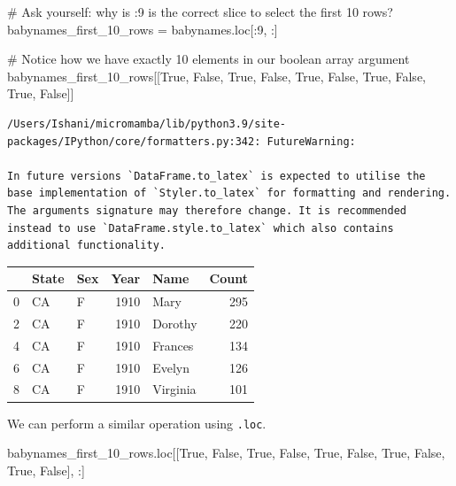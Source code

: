 \documentclass[
  letterpaper,
  DIV=11,
  numbers=noendperiod]{scrreprt}
\newenvironment{Shaded}{\begin{snugshade}}{\end{snugshade}}
\newcommand{\CommentTok}[1]{\textcolor[rgb]{0.37,0.37,0.37}{#1}}
\newcommand{\DecValTok}[1]{\textcolor[rgb]{0.68,0.00,0.00}{#1}}
\newcommand{\NormalTok}[1]{\textcolor[rgb]{0.00,0.23,0.31}{#1}}
\newcommand{\OperatorTok}[1]{\textcolor[rgb]{0.37,0.37,0.37}{#1}}
\newcommand{\VariableTok}[1]{\textcolor[rgb]{0.07,0.07,0.07}{#1}}
\begin{document}
\begin{Shaded}
\begin{Highlighting}[]
\CommentTok{\# Ask yourself: why is :9 is the correct slice to select the first 10 rows?}
\NormalTok{babynames\_first\_10\_rows }\OperatorTok{=}\NormalTok{ babynames.loc[:}\DecValTok{9}\NormalTok{, :]}

\CommentTok{\# Notice how we have exactly 10 elements in our boolean array argument}
\NormalTok{babynames\_first\_10\_rows[[}\VariableTok{True}\NormalTok{, }\VariableTok{False}\NormalTok{, }\VariableTok{True}\NormalTok{, }\VariableTok{False}\NormalTok{, }\VariableTok{True}\NormalTok{, }\VariableTok{False}\NormalTok{, }\VariableTok{True}\NormalTok{, }\VariableTok{False}\NormalTok{, }\VariableTok{True}\NormalTok{, }\VariableTok{False}\NormalTok{]]}
\end{Highlighting}
\end{Shaded}

\begin{verbatim}
/Users/Ishani/micromamba/lib/python3.9/site-packages/IPython/core/formatters.py:342: FutureWarning:

In future versions `DataFrame.to_latex` is expected to utilise the base implementation of `Styler.to_latex` for formatting and rendering. The arguments signature may therefore change. It is recommended instead to use `DataFrame.style.to_latex` which also contains additional functionality.
\end{verbatim}

\begin{tabular}{lllrlr}
\toprule
{} & State & Sex &  Year &      Name &  Count \\
\midrule
0 &    CA &   F &  1910 &      Mary &    295 \\
2 &    CA &   F &  1910 &   Dorothy &    220 \\
4 &    CA &   F &  1910 &   Frances &    134 \\
6 &    CA &   F &  1910 &    Evelyn &    126 \\
8 &    CA &   F &  1910 &  Virginia &    101 \\
\bottomrule
\end{tabular}

We can perform a similar operation using \texttt{.loc}.

\begin{Shaded}
\begin{Highlighting}[]
\NormalTok{babynames\_first\_10\_rows.loc[[}\VariableTok{True}\NormalTok{, }\VariableTok{False}\NormalTok{, }\VariableTok{True}\NormalTok{, }\VariableTok{False}\NormalTok{, }\VariableTok{True}\NormalTok{, }\VariableTok{False}\NormalTok{, }\VariableTok{True}\NormalTok{, }\VariableTok{False}\NormalTok{, }\VariableTok{True}\NormalTok{, }\VariableTok{False}\NormalTok{], :]}
\end{Highlighting}
\end{Shaded}
\end{document}
